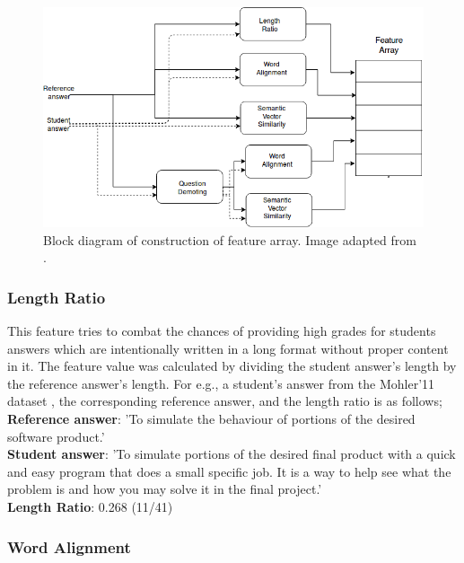 	\begin{figure}[h]
		\centering
		\includegraphics[scale=0.4]{images/feature_array}
		\caption{Block diagram of construction of feature array. Image adapted from \cite{ramesh2} \cite{Sultan2016}.}
		\label{sultan_features}
	\end{figure} 
	
	\subsubsection{Length Ratio}
	
	This feature tries to combat the chances of providing high grades for students answers which are intentionally written in a long format without proper content in it. The feature value was calculated by dividing the student answer's length by the reference answer's length. For e.g., a student's answer from the Mohler'11 dataset \cite{Mohler2011}, the corresponding reference answer, and the length ratio is as follows; \\
	
	\noindent \textbf{Reference answer}: 'To simulate the behaviour of portions of the desired software product.' \\
	\textbf{Student answer}: 'To simulate portions of the desired final product with a quick and easy program that does a small specific job.  It is a way to help see what the problem is and how you may solve it in the final project.'\\
	\textbf{Length Ratio}: 0.268 (11/41)
	
	
	\subsubsection{Word Alignment \cite{sultan2014back}}
	
